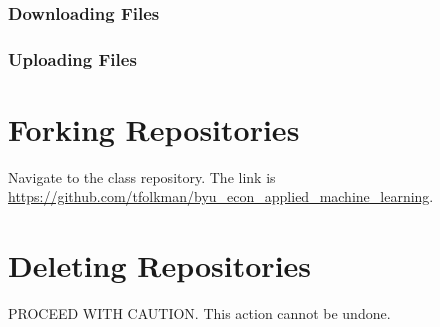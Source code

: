 \documentclass[11pt,a4paper]{article}
\begin{document}
\subsubsection*{Downloading Files}

\subsubsection*{Uploading Files}

\section*{Forking Repositories}
Navigate to the class repository. 
The link is \url{https://github.com/tfolkman/byu_econ_applied_machine_learning}.

\section*{Deleting Repositories}
PROCEED WITH CAUTION.
This action cannot be undone.
\end{document}
